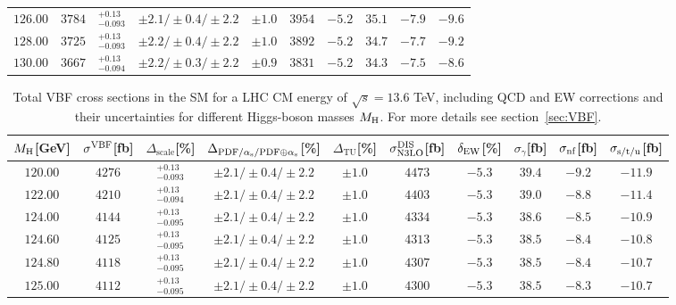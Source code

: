 \begin{table}[ht!]
\begin{center}
\begin{small}
\begin{tabular}{cccccccc|cc}
$126.00$ & $3784$ & $^{+0.13}_{-0.093}$ & $\pm 2.1/\pm 0.4/\pm 2.2$ & $\pm 1.0$ & $3954$ & $-5.2$ & $35.1 $ & $-7.9$ & $-9.6 $ \\
$128.00$ & $3725$ & $^{+0.13}_{-0.093}$ & $\pm 2.2/\pm 0.4/\pm 2.2$ & $\pm 1.0$ & $3892$ & $-5.2$ & $34.7 $ & $-7.7$ & $-9.2 $ \\
$130.00$ & $3667$ & $^{+0.13}_{-0.094}$ & $\pm 2.2/\pm 0.3/\pm 2.2$ & $\pm 0.9$ & $3831$ & $-5.2$ & $34.3 $ & $-7.5$ & $-8.6 $ \\
\bottomrule
\end{tabular}%
\end{small}%
\end{center}%
\end{table}

\begin{table}[ht!]
\caption{Total VBF cross sections in the SM for a LHC CM energy of $\sqrt{s}=13.6$ TeV, including QCD and EW corrections
and their uncertainties for different Higgs-boson masses $M_\mathrm{H}$. For more details see section~\ref{sec:VBF}.}
\label{tab:vbf_XStot_136}
\begin{center}%
\begin{small}%
\begin{tabular}{cccccccc|cc}%
\toprule
$M_\mathrm{H}$[GeV] & $\sigma^{\mathrm{VBF}}$[fb] & $\Delta_{\mathrm{scale}}$[\%] & $\Delta_{\mathrm{PDF}/\alpha_{\mathrm{s}}/\mathrm{PDF\oplus\alpha_{\mathrm{s}}}}$[\%] & $\Delta_{\mathrm{TU}}$[\%] &
$\sigma_{\mathrm{N3LO}}^{\mathrm{DIS}}$[fb] & $\delta_{\mathrm{EW}}$[\%] & $\sigma_{\gamma}$[fb] & $\sigma_{\mbox{\scriptsize nf}}$[fb] & $\sigma_{\mbox{\scriptsize s/t/u}}$[fb]
\\
\midrule
$120.00$ & $4276$ & $^{+0.13}_{-0.093}$ & $\pm 2.1/\pm 0.4/\pm 2.2$ & $\pm 1.0$ & $4473$ & $-5.3$ & $39.4$ & $-9.2$ & $-11.9$ \\
$122.00$ & $4210$ & $^{+0.13}_{-0.094}$ & $\pm 2.1/\pm 0.4/\pm 2.2$ & $\pm 1.0$ & $4403$ & $-5.3$ & $39.0$ & $-8.8$ & $-11.4$ \\
$124.00$ & $4144$ & $^{+0.13}_{-0.095}$ & $\pm 2.1/\pm 0.4/\pm 2.2$ & $\pm 1.0$ & $4334$ & $-5.3$ & $38.6$ & $-8.5$ & $-10.9$ \\
$124.60$ & $4125$ & $^{+0.13}_{-0.095}$ & $\pm 2.1/\pm 0.4/\pm 2.2$ & $\pm 1.0$ & $4313$ & $-5.3$ & $38.5$ & $-8.4$ & $-10.8$ \\
$124.80$ & $4118$ & $^{+0.13}_{-0.095}$ & $\pm 2.1/\pm 0.4/\pm 2.2$ & $\pm 1.0$ & $4307$ & $-5.3$ & $38.5$ & $-8.4$ & $-10.7$ \\
$125.00$ & $4112$ & $^{+0.13}_{-0.095}$ & $\pm 2.1/\pm 0.4/\pm 2.2$ & $\pm 1.0$ & $4300$ & $-5.3$ & $38.5$ & $-8.3$ & $-10.7$ \\

\end{tabular}
\end{small}
\end{center}
\end{table}
